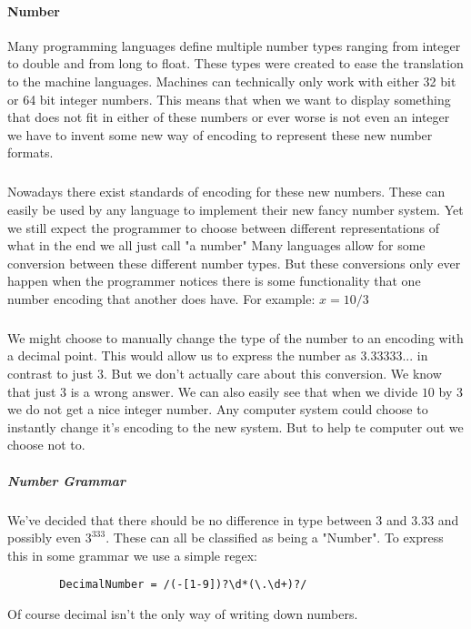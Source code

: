 \documentclass{scrartcl}
\begin{document}
    \paragraph{Number}
    Many programming languages define multiple number types ranging from integer to
    double and from long to float. These types were created to ease the translation
    to the machine languages. Machines can technically only work with either 32 bit
    or 64 bit integer numbers. This means that when we want to display something
    that does not fit in either of these numbers or ever worse is not even an integer
    we have to invent some new way of encoding to represent these new number formats.

    \subparagraph{}
    Nowadays there exist standards of encoding for these new numbers. These can easily
    be used by any language to implement their new fancy number system. Yet we still
    expect the programmer to choose between different representations of what in the
    end we all just call "a number" Many languages allow for some conversion between
    these different number types. But these conversions only ever happen when the
    programmer notices there is some functionality that one number encoding that
    another does have. For example: $x = 10 / 3$ 

    \subparagraph{}
    We might choose to manually change the type of the number to an encoding with a
    decimal point. This would allow us to express the number as $3.33333...$ in contrast
    to just $3$. But we don't actually care about this conversion. We know that just $3$
    is a wrong answer. We can also easily see that when we divide $10$ by $3$ we do
    not get a nice integer number. Any computer system could choose to instantly change
    it's encoding to the new system. But to help te computer out we choose not to. 

    \subparagraph{Number Grammar} 
    We've decided that there should be no difference in type between $3$ and $3.33$ and
    possibly even $3^{333}$. These can all be classified as being a "Number". To express this
    in some grammar we use a simple regex:

    \begin{lstlisting}
        DecimalNumber = /(-[1-9])?\d*(\.\d+)?/
    \end{lstlisting}

    Of course decimal isn't the only way of writing down numbers. 
\end{document}
